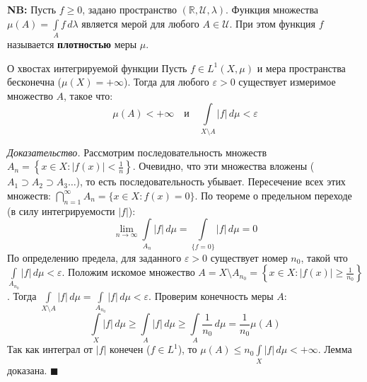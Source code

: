 \documentclass[12pt,a4paper]{article}
\newenvironment{Proof}[1][Доказательство]{\vspace{0.5em}\noindent\textit{#1.}\hspace{0.5em}\ignorespaces}{\hfill$\blacksquare$\vspace{1em}}
\begin{document}
\noindent \textbf{NB:} Пусть $f \ge 0$, задано пространство $(\mathbb{R}, \mathcal{U}, \lambda)$. Функция множества $\mu(A) = \int\limits_A f \, d\lambda$ является мерой для любого $A \in \mathcal{U}$. При этом функция $f$ называется \textbf{плотностью} меры $\mu$.

\begin{Lemma}{О хвостах интегрируемой функции}{}
Пусть $f \in L^1(X, \mu)$ и мера пространства бесконечна ($\mu(X) = +\infty$). Тогда для любого $\varepsilon > 0$ существует измеримое множество $A$, такое что:
$$ \mu(A) < +\infty \quad \text{и} \quad \int\limits_{X \setminus A} |f| \, d\mu < \varepsilon $$
\end{Lemma}

\begin{Proof}
Рассмотрим последовательность множеств $A_n = \left\{ x \in X : |f(x)| < \frac{1}{n} \right\}$. 
Очевидно, что эти множества вложены ($A_1 \supset A_2 \supset A_3 \dots$), то есть последовательность убывает. Пересечение всех этих множеств: $\bigcap\limits_{n=1}^{\infty} A_n = \{ x \in X : f(x) = 0 \}$.
По теореме о предельном переходе (в силу интегрируемости $|f|$):
$$ \lim\limits_{n \to \infty} \int\limits_{A_n} |f| \, d\mu = \int\limits_{\{f=0\}} |f| \, d\mu = 0 $$
По определению предела, для заданного $\varepsilon > 0$ существует номер $n_0$, такой что $\int\limits_{A_{n_0}} |f| \, d\mu < \varepsilon$.
Положим искомое множество $A = X \setminus A_{n_0} = \left\{ x \in X : |f(x)| \ge \frac{1}{n_0} \right\}$.
Тогда $\int\limits_{X \setminus A} |f| \, d\mu = \int\limits_{A_{n_0}} |f| \, d\mu < \varepsilon$.
Проверим конечность меры $A$:
$$ \int\limits_X |f| \, d\mu \ge \int\limits_A |f| \, d\mu \ge \int\limits_A \frac{1}{n_0} \, d\mu = \frac{1}{n_0} \mu(A) $$
Так как интеграл от $|f|$ конечен ($f \in L^1$), то $\mu(A) \le n_0 \int\limits_X |f| \, d\mu < +\infty$. Лемма доказана.
\end{Proof}
\end{document}
